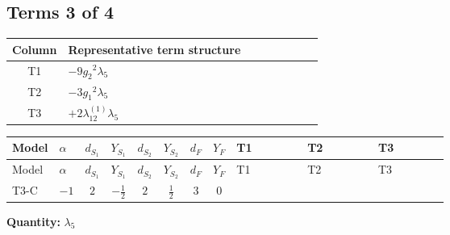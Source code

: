 \documentclass[8pt]{article}
\begin{document}
\begin{landscape}
\subsection*{Terms 3 of 4}
\begin{center}
\begin{tabular}{@{}c >{\raggedright\arraybackslash}p{0.82\linewidth}@{}}
\toprule
Column & Representative term structure \\
\midrule
T1 & \(\displaystyle -9 {g_2}^2 {\lambda_5}\) \\
\midrule
T2 & \(\displaystyle -3 {g_1}^2 {\lambda_5}\) \\
\midrule
T3 & \(\displaystyle +2 {\lambda_{12}^{(1)}} {\lambda_5}\) \\
\midrule
\bottomrule
\end{tabular}
\end{center}
\smallskip
\tiny
\begin{longtable}{@{}llcccccc >{\raggedright\arraybackslash}p{0.21\linewidth} >{\raggedright\arraybackslash}p{0.21\linewidth} >{\raggedright\arraybackslash}p{0.21\linewidth}@{}}
\toprule
Model & $\alpha$ & $d_{S_1}$ & $Y_{S_1}$ & $d_{S_2}$ & $Y_{S_2}$ & $d_F$ & $Y_F$ & T1 & T2 & T3 \\
\midrule
\endfirsthead
\toprule
Model & $\alpha$ & $d_{S_1}$ & $Y_{S_1}$ & $d_{S_2}$ & $Y_{S_2}$ & $d_F$ & $Y_F$ & T1 & T2 & T3 \\
\midrule
\endhead
T3-C & $-1$ & $2$ & $-\frac{1}{2}$ & $2$ & $\frac{1}{2}$ & $3$ & $0$ & \scriptsize\adjustbox{max width=\linewidth}{$\begin{gathered} -9 {g_2}^2 {\lambda_5}\end{gathered}$} & \scriptsize\adjustbox{max width=\linewidth}{$\begin{gathered} -3 {g_1}^2 {\lambda_5}\end{gathered}$} & \scriptsize\adjustbox{max width=\linewidth}{$\begin{gathered} +2 {\lambda_{12}^{(1)}} {\lambda_5}\end{gathered}$} \\
\midrule
\bottomrule
\end{longtable}
\clearpage
\noindent\textbf{Quantity: }$\lambda_5$\par\smallskip

\end{landscape}
\end{document}
